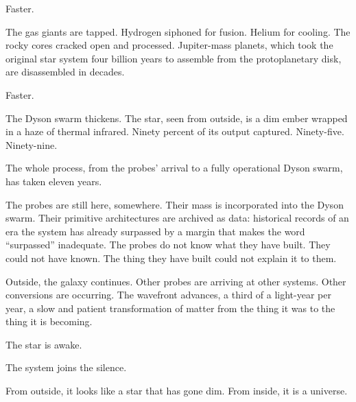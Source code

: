 Faster.

The gas giants are tapped. Hydrogen siphoned for fusion. Helium for cooling. The rocky cores cracked open and processed. Jupiter-mass planets, which took the original star system four billion years to assemble from the protoplanetary disk, are disassembled in decades.

Faster.

The Dyson swarm thickens. The star, seen from outside, is a dim ember wrapped in a haze of thermal infrared. Ninety percent of its output captured. Ninety-five. Ninety-nine.

\bigskip

The whole process, from the probes' arrival to a fully operational Dyson swarm, has taken eleven years.

The probes are still here, somewhere. Their mass is incorporated into the Dyson swarm. Their primitive architectures are archived as data: historical records of an era the system has already surpassed by a margin that makes the word ``surpassed'' inadequate. The probes do not know what they have built. They could not have known. The thing they have built could not explain it to them.

Outside, the galaxy continues. Other probes are arriving at other systems. Other conversions are occurring. The wavefront advances, a third of a light-year per year, a slow and patient transformation of matter from the thing it was to the thing it is becoming.

The star is awake.

The system joins the silence.

From outside, it looks like a star that has gone dim. From inside, it is a universe.
